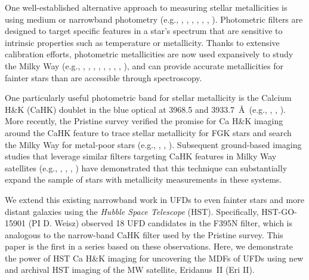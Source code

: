 \documentclass[twocolumn]{aastex63}
\begin{document}
\par One well-established alternative approach to measuring stellar metallicities is using medium or narrowband photometry (e.g., \citealt{stromgren1966}, \citealt{mcclure1968photomet}, \citealt{carney1979}, \citealt{geisler1991}, \citealt{lenz1998sdssphotomets}, \citealt{karaali2005sdss}, \citealt{ross2013hstphotomet}).  Photometric filters are designed to target specific features in a star's spectrum that are sensitive to intrinsic properties such as temperature or metallicity.  Thanks to extensive calibration efforts, photometric metallicities are now used expansively to study the Milky Way (e.g., \citealt{helmi2003MW}, \citealt{ivezic2008sdssphotomet}, \citealt{an2013mwhalo}, \citealt{huang2019mwtomography}, \citealt{youakim2020mpmw}, \citealt{arentson2020bulge}, \citealt{cenarro2019jplus}, \citealt{chiti2021skymapper}, \citealt{whitten2021splus}), and can provide accurate metallicities for fainter stars than are accessible through spectroscopy.

\par One particularly useful photometric band for stellar metallicity is the Calcium H\&K (CaHK) doublet in the blue optical at 3968.5 and 3933.7~\AA~(e.g., \citealt{zinn1980}, \citealt{beers1985cahk}, \citealt{anthonytwarog1991}). More recently, the Pristine survey verified the promise for Ca H\&K imaging around the CaHK feature to trace stellar metallicity for FGK stars \citep[e.g. ][]{starkenburg2017pristine} and search the Milky Way for metal-poor stars (e.g., \citealt{youakim2017pristine}, \citealt{aguado2019pristine}, \citealt{venn2020pristine}). Subsequent ground-based imaging studies that leverage similar filters targeting CaHK features in Milky Way satellites (e.g., \citealt{longeard2018dracoII}, \citealt{han2020narrowbandsubaru}, \citealt{chiti2020tucIIskymapper}, \citealt{longeard2021SgrIIGC}) have demonstrated that this technique can substantially expand the sample of stars with metallicity measurements in these systems. 

\par We extend this existing narrowband work in UFDs to even fainter stars and more distant galaxies using the \textit{Hubble Space Telescope} (HST). Specifically, HST-GO-15901 (PI D. Weisz) observed 18 UFD candidates in the F395N filter, which is analogous to the narrow-band CaHK filter used by the Pristine survey. This paper is the first in a series based on these observations.  Here, we demonstrate the power of HST Ca H\&K imaging for uncovering the MDFs of UFDs using new and archival HST imaging of the MW satellite, Eridanus~II (Eri II).
\end{document}
